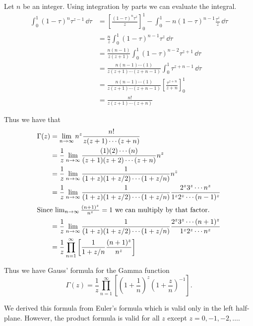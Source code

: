 Let $n$ be an integer.  Using integration by parts we can evaluate the integral.
\begin{align*}
  \int_0^1 (1-\tau)^n \tau^{z-1} \,\dd \tau
  &= \left[ \frac{(1-\tau)^n \tau^z}{z} \right]_0^1
  - \int_0^1 -n (1-\tau)^{n-1} \frac{\tau^z}{z} \,\dd \tau \\
  &= \frac{n}{z} \int_0^1 (1-\tau)^{n-1} \tau^z \,\dd \tau \\
  &= \frac{n(n-1)}{z(z+1)} \int_0^1 (1-\tau)^{n-2} \tau^{z+1} \,\dd \tau \\
  &= \frac{n(n-1)\cdots(1)}{z(z+1)\cdots(z+n-1)}
  \int_0^1 \tau^{z + n - 1} \,\dd \tau \\
  &= \frac{n(n-1)\cdots(1)}{z(z+1)\cdots(z+n-1)}
  \left[ \frac{\tau^{z+n}}{z+n} \right]_0^1 \\
  &= \frac{n!}{z(z+1)\cdots(z+n)}
\end{align*}

Thus we have that
\begin{align*}
  \Gamma(z)
  &= \lim_{n \to \infty} n^z \frac{n!}{z(z+1)\cdots(z+n)} \\
  &= \frac{1}{z} \lim_{n \to \infty} \frac{(1)(2)\cdots(n)}
  {(z+1)(z+2)\cdots(z+n)} n^z \\
  &= \frac{1}{z} \lim_{n \to \infty} \frac{1}{(1+z)(1+z/2)\cdots(1+z/n)}
  n^z \\
  &= \frac{1}{z} \lim_{n \to \infty} \frac{1}{(1+z)(1+z/2)\cdots(1+z/n)}
  \frac{2^z 3^z \cdots n^z}{1^z 2^z \cdots (n-1)^z} \\
  \intertext{Since $\lim_{n \to \infty} \frac{(n+1)^z}{n^z} = 1$ we can 
    multiply by that factor.}
  &= \frac{1}{z} \lim_{n \to \infty} \frac{1}{(1+z)(1+z/2)\cdots(1+z/n)}
  \frac{2^z 3^z \cdots (n+1)^z}{1^z 2^z \cdots n^z} \\
  &= \frac{1}{z} \prod_{n=1}^\infty \left[ \frac{1}{1+z/n}
    \frac{(n+1)^z}{n^z} \right] 
\end{align*}

Thus we have Gauss' formula for the Gamma function
\[ \boxed{ \Gamma(z) = \frac{1}{z} \prod_{n=1}^\infty \left[ \left(
      1 + \frac{1}{n} \right)^z \left(1 + \frac{z}{n} \right)^{-1} 
  \right]. } \]

We derived this formula from Euler's formula which is valid only in 
the left half-plane.  However, the product formula is valid for all $z$ 
except $z = 0, -1, -2, \ldots$.













